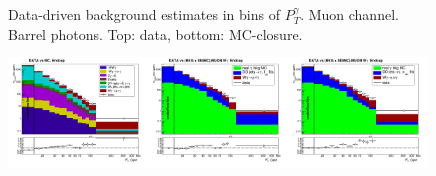 \begin{figure}[htb]
\begin{center}
  \caption{Data-driven background estimates in bins of $P_T^{\gamma}$. Muon channel. Barrel photons. Top: data, bottom: MC-closure. }
  \end{center}
\end{figure}

\begin{figure}[htb]
  \begin{center}
   \includegraphics[width=0.33\textwidth]{../figs/figs_v11/MUON_WGamma/PrepareYields/c_TotalDATAvsMC_Endcap__phoEt.png}\includegraphics[width=0.33\textwidth]{../figs/figs_v11/MUON_WGamma/PrepareYields/c_DATAvsBkgPlusSigMCc_MUON_WGamma_TEMPL_CHISO_UNblind__Endcap__phoEt.png}\includegraphics[width=0.33\textwidth]{../figs/figs_v11/MUON_WGamma/PrepareYields/c_DATAvsBkgPlusSigMCc_MUON_WGamma_TEMPL_SIHIH_UNblind__Endcap__phoEt.png}

\end{center}
\end{figure}
